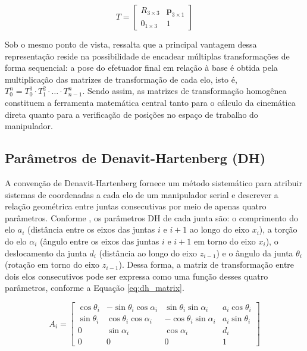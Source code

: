 \begin{equation}
T = \begin{bmatrix} R_{3\times3} & \mathbf{p}_{3\times1} \\ 0_{1\times3} & 1 \end{bmatrix}
\label{eq:transf_homogenea}
\end{equation}

Sob o mesmo ponto de vista,  ressalta que a principal vantagem dessa representação reside na possibilidade de encadear múltiplas transformações de forma sequencial: a pose do efetuador final em relação à base é obtida pela multiplicação das matrizes de transformação de cada elo, isto é, $T_0^n = T_0^1 \cdot T_1^2 \cdot \ldots \cdot T_{n-1}^n$. Sendo assim, as matrizes de transformação homogênea constituem a ferramenta matemática central tanto para o cálculo da cinemática direta quanto para a verificação de posições no espaço de trabalho do manipulador.

\subsection{Parâmetros de Denavit-Hartenberg (DH)}

A convenção de Denavit-Hartenberg fornece um método sistemático para atribuir sistemas de coordenadas a cada elo de um manipulador serial e descrever a relação geométrica entre juntas consecutivas por meio de apenas quatro parâmetros. Conforme , os parâmetros DH de cada junta são: o comprimento do elo $a_i$ (distância entre os eixos das juntas $i$ e $i+1$ ao longo do eixo $x_i$), a torção do elo $\alpha_i$ (ângulo entre os eixos das juntas $i$ e $i+1$ em torno do eixo $x_i$), o deslocamento da junta $d_i$ (distância ao longo do eixo $z_{i-1}$) e o ângulo da junta $\theta_i$ (rotação em torno do eixo $z_{i-1}$). Dessa forma, a matriz de transformação entre dois elos consecutivos pode ser expressa como uma função desses quatro parâmetros, conforme a Equação \ref{eq:dh_matrix}.

\begin{equation}
A_i = \begin{bmatrix}
\cos\theta_i & -\sin\theta_i \cos\alpha_i & \sin\theta_i \sin\alpha_i & a_i \cos\theta_i \\
\sin\theta_i & \cos\theta_i \cos\alpha_i & -\cos\theta_i \sin\alpha_i & a_i \sin\theta_i \\
0 & \sin\alpha_i & \cos\alpha_i & d_i \\
0 & 0 & 0 & 1
\end{bmatrix}
\label{eq:dh_matrix}
\end{equation}

